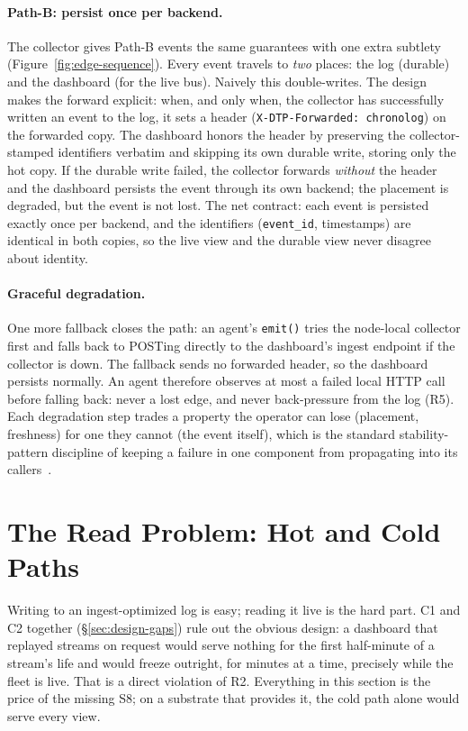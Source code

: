\paragraph{Path-B: persist once per backend.} The collector gives Path-B
events the same guarantees with one extra subtlety
(Figure~\ref{fig:edge-sequence}). Every event travels to
\emph{two} places: the log (durable) and the dashboard (for
the live bus). Naively this double-writes. The design makes the forward
explicit: when, and only when, the collector has successfully written an
event to the log, it sets a header (\texttt{X-DTP-Forwarded: chronolog})
on the forwarded copy. The dashboard honors the header by preserving the
collector-stamped identifiers verbatim and skipping its own durable write,
storing only the hot copy. If the durable write failed, the collector
forwards \emph{without} the header and the dashboard persists the event
through its own backend; the placement is degraded, but the event is
not lost. The net
contract: each event is persisted exactly once per backend, and the
identifiers (\texttt{event\_id}, timestamps) are identical in both copies,
so the live view and the durable view never disagree about identity.

\paragraph{Graceful degradation.} One more fallback closes the path: an
agent's \texttt{emit()} tries the node-local collector first and falls back
to POSTing directly to the dashboard's ingest endpoint if the collector is
down. The fallback sends no forwarded header, so the dashboard persists
normally. An agent therefore observes at most a failed local HTTP call
before falling back: never a lost edge, and never back-pressure from the
log (R5). Each degradation step trades a property the operator can lose
(placement, freshness) for one they cannot (the event itself), which is
the standard stability-pattern discipline of keeping a failure in one
component from propagating into its callers~\cite{nygard2018releaseit}.

\section{The Read Problem: Hot and Cold Paths}
\label{sec:design-read}

Writing to an ingest-optimized log is easy; reading it live is the hard
part. C1 and C2 together (\S\ref{sec:design-gaps}) rule out the
obvious design: a dashboard that replayed streams on request would serve
nothing for the first half-minute of a stream's life and would freeze
outright, for minutes at a time, precisely while the fleet is live. That is
a direct violation of R2. Everything in this section is the price of the
missing S8; on a substrate that provides it, the cold path alone would
serve every view.

